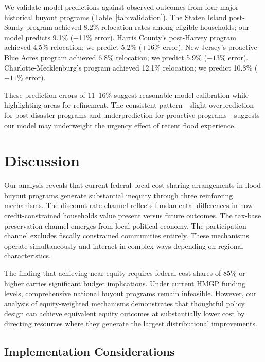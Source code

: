 \documentclass[11pt,letterpaper]{article}
\theoremstyle{definition}
\begin{document}
We validate model predictions against observed outcomes from four major historical buyout programs (Table~\ref{tab:validation}). The Staten Island post-Sandy program achieved 8.2\% relocation rates among eligible households; our model predicts 9.1\% (+11\% error). Harris County's post-Harvey program achieved 4.5\% relocation; we predict 5.2\% (+16\% error). New Jersey's proactive Blue Acres program achieved 6.8\% relocation; we predict 5.9\% ($-13$\% error). Charlotte-Mecklenburg's program achieved 12.1\% relocation; we predict 10.8\% ($-11$\% error).

These prediction errors of 11--16\% suggest reasonable model calibration while highlighting areas for refinement. The consistent pattern---slight overprediction for post-disaster programs and underprediction for proactive programs---suggests our model may underweight the urgency effect of recent flood experience.

\section{Discussion}

Our analysis reveals that current federal--local cost-sharing arrangements in flood buyout programs generate substantial inequity through three reinforcing mechanisms. The discount rate channel reflects fundamental differences in how credit-constrained households value present versus future outcomes. The tax-base preservation channel emerges from local political economy. The participation channel excludes fiscally constrained communities entirely. These mechanisms operate simultaneously and interact in complex ways depending on regional characteristics.

The finding that achieving near-equity requires federal cost shares of 85\% or higher carries significant budget implications. Under current HMGP funding levels, comprehensive national buyout programs remain infeasible. However, our analysis of equity-weighted mechanisms demonstrates that thoughtful policy design can achieve equivalent equity outcomes at substantially lower cost by directing resources where they generate the largest distributional improvements.

\subsection{Implementation Considerations}
\end{document}
